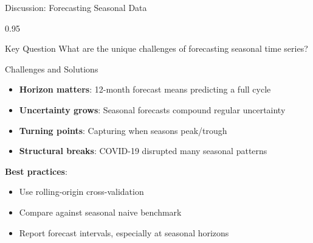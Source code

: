 \documentclass[9pt, aspectratio=169, t]{beamer}
\begin{document}
\begin{frame}{Discussion: Forecasting Seasonal Data}
    \begin{cminipage}{0.95\textwidth}
    \begin{block}{Key Question}
        What are the unique challenges of forecasting seasonal time series?
    \end{block}

    \vspace{0.2cm}

    \begin{block}{Challenges and Solutions}
        \begin{itemize}\setlength{\itemsep}{0pt}
            \item \textbf{Horizon matters}: 12-month forecast means predicting a full cycle
            \item \textbf{Uncertainty grows}: Seasonal forecasts compound regular uncertainty
            \item \textbf{Turning points}: Capturing when seasons peak/trough
            \item \textbf{Structural breaks}: COVID-19 disrupted many seasonal patterns
        \end{itemize}

        \vspace{0.2cm}
        \textbf{Best practices}:
        \begin{itemize}\setlength{\itemsep}{0pt}
            \item Use rolling-origin cross-validation
            \item Compare against seasonal naive benchmark
            \item Report forecast intervals, especially at seasonal horizons
        \end{itemize}
    \end{block}
    \end{cminipage}
\end{frame}
\end{document}

